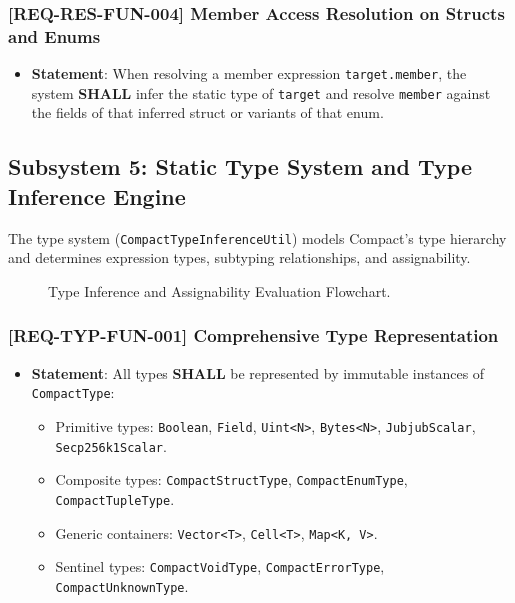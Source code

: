 \subsubsection{[REQ-RES-FUN-004] Member Access Resolution on Structs and Enums}
\begin{itemize}
    \item \textbf{Statement}: When resolving a member expression \texttt{target.member}, the system \textbf{SHALL} infer the static type of \texttt{target} and resolve \texttt{member} against the fields of that inferred struct or variants of that enum.
\end{itemize}

\subsection{Subsystem 5: Static Type System and Type Inference Engine}
\label{sec:subsystem_type_engine}

The type system (\texttt{CompactTypeInferenceUtil}) models Compact's type hierarchy and determines expression types, subtyping relationships, and assignability.

\begin{figure}[htbp]
    \centering
    
    \caption{Type Inference and Assignability Evaluation Flowchart.}
    \label{fig:flowchart_type_inference}
\end{figure}

\subsubsection{[REQ-TYP-FUN-001] Comprehensive Type Representation}
\begin{itemize}
    \item \textbf{Statement}: All types \textbf{SHALL} be represented by immutable instances of \texttt{CompactType}:
    \begin{itemize}
        \item Primitive types: \texttt{Boolean}, \texttt{Field}, \texttt{Uint<N>}, \texttt{Bytes<N>}, \texttt{JubjubScalar}, \texttt{Secp256k1Scalar}.
        \item Composite types: \texttt{CompactStructType}, \texttt{CompactEnumType}, \texttt{CompactTupleType}.
        \item Generic containers: \texttt{Vector<T>}, \texttt{Cell<T>}, \texttt{Map<K, V>}.
        \item Sentinel types: \texttt{CompactVoidType}, \texttt{CompactErrorType}, \texttt{CompactUnknownType}.
    \end{itemize}
\end{itemize}

